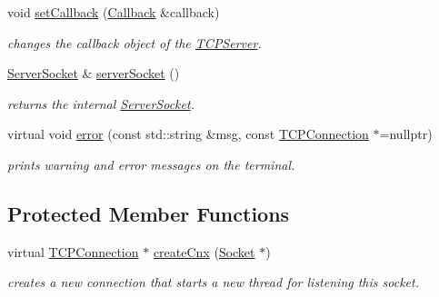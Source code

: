 \begin{DoxyCompactItemize}
void \mbox{\hyperlink{classcppu_1_1_t_c_p_server_a94d3d97b03d5e3e48609e405d8dd7897}{set\+Callback}} (\mbox{\hyperlink{structcppu_1_1_t_c_p_server_1_1_callback}{Callback}} \&callback)
\begin{DoxyCompactList}\small\item\em changes the callback object of the \mbox{\hyperlink{classcppu_1_1_t_c_p_server}{T\+C\+P\+Server}}. \end{DoxyCompactList}\item 
\mbox{\label{classcppu_1_1_t_c_p_server_a6428b63a4440045050dba4f33bb454bf}} 
\mbox{\hyperlink{classcppu_1_1_server_socket}{Server\+Socket}} \& \mbox{\hyperlink{classcppu_1_1_t_c_p_server_a6428b63a4440045050dba4f33bb454bf}{server\+Socket}} ()
\begin{DoxyCompactList}\small\item\em returns the internal \mbox{\hyperlink{classcppu_1_1_server_socket}{Server\+Socket}}. \end{DoxyCompactList}\item 
\mbox{\label{classcppu_1_1_t_c_p_server_afc47ca4476d9c75d5ea88f73e2acd6d5}} 
virtual void \mbox{\hyperlink{classcppu_1_1_t_c_p_server_afc47ca4476d9c75d5ea88f73e2acd6d5}{error}} (const std\+::string \&msg, const \mbox{\hyperlink{classcppu_1_1_t_c_p_connection}{T\+C\+P\+Connection}} $\ast$=nullptr)
\begin{DoxyCompactList}\small\item\em prints warning and error messages on the terminal. \end{DoxyCompactList}\end{DoxyCompactItemize}
\subsection*{Protected Member Functions}
\begin{DoxyCompactItemize}
\item 
\mbox{\label{classcppu_1_1_t_c_p_server_abe314b95a31c88b479c81ec9bf123c65}} 
virtual \mbox{\hyperlink{classcppu_1_1_t_c_p_connection}{T\+C\+P\+Connection}} $\ast$ \mbox{\hyperlink{classcppu_1_1_t_c_p_server_abe314b95a31c88b479c81ec9bf123c65}{create\+Cnx}} (\mbox{\hyperlink{classcppu_1_1_socket}{Socket}} $\ast$)
\begin{DoxyCompactList}\small\item\em creates a new connection that starts a new thread for listening this socket. \end{DoxyCompactList}\end{DoxyCompactItemize}
